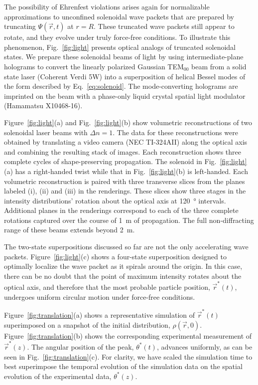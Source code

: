 The possibility of Ehrenfest violations arises again
for normalizable approximations to unconfined
solenoidal wave packets that are prepared by truncating
$\Psi(\vec{r},t)$ at $r = R$.
These truncated wave packets still appear to rotate,
and they evolve under truly force-free conditions.
To illustrate this phenomenon, Fig.~\ref{fig:light}
presents optical analogs of truncated solenoidal states.
We prepare these solenoidal beams of light
by using intermediate-plane holograms \cite{mondal18}
to convert the linearly polarized
Gaussian TEM$_{00}$ beam from
a solid state laser (Coherent Verdi 5W) into a superposition
of helical Bessel modes of the form described by
Eq.~\eqref{eq:solenoid}.
The mode-converting holograms are imprinted
on the beam with a phase-only liquid crystal 
spatial light modulator (Hamamatsu X10468-16).

Figure~\ref{fig:light}(a) and Fig.~\ref{fig:light}(b)
show volumetric reconstructions of two
solenoidal laser beams with $\Delta n = 1$.
The data for these reconstructions
were obtained by translating a video camera 
(NEC TI-324AII) along the optical axis and
combining the resulting stack of images.
Each reconstruction shows three complete cycles of shape-preserving
propagation.
The solenoid in Fig.~\ref{fig:light}(a) has a right-handed twist
while that in Fig.~\ref{fig:light}(b) is left-handed.
Each volumetric reconstruction is paired with three
transverse slices from the planes labeled
(i), (ii) and (iii) in the renderings.
These slices show three stages in the
intensity distributions' rotation about the optical axis at
\SI{120}{\degree} intervals.
Additional planes in the renderings
correspond to each of the three complete rotations
captured over the
course of \SI{1}{\meter} of propagation.  The full non-diffracting
range of these beams extends beyond \SI{2}{\meter}.

The two-state superpositions discussed so far are not
the only accelerating wave packets.
Figure~\ref{fig:light}(c) shows a four-state superposition
designed to optimally localize the wave packet as it spirals
around the origin.
In this case, there can be no doubt that the point of
maximum intensity rotates about the 
optical axis, and therefore that
the most probable particle position,
$\vec{r}^\ast(t)$, undergoes uniform
circular motion under force-free conditions.

Figure~\ref{fig:translation}(a)
shows a representative simulation of
$\vec{r}^\ast(t)$ superimposed on a snapshot
of the initial distribution, $\rho(\vec{r},0)$.
Figure~\ref{fig:translation}(b) shows the corresponding
experimental measurement of $\vec{r}^\ast(z)$.
The angular position of the peak, $\theta^\ast(t)$,
advances uniformly, as can be seen in Fig.~\ref{fig:translation}(c).
For clarity, we have scaled the simulation time to best
superimpose the temporal evolution of the simulation
data on the spatial evolution of the experimental data, $\theta^\ast(z)$.

